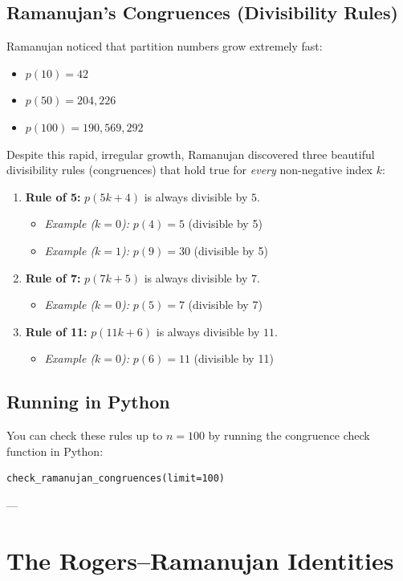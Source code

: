 \documentclass[11pt]{article}
\begin{document}
\subsection{Ramanujan's Congruences (Divisibility Rules)}
Ramanujan noticed that partition numbers grow extremely fast:
\begin{itemize}
    \item $p(10) = 42$
    \item $p(50) = 204,226$
    \item $p(100) = 190,569,292$
\end{itemize}
Despite this rapid, irregular growth, Ramanujan discovered three beautiful divisibility rules (congruences) that hold true for \emph{every} non-negative index $k$:
\begin{enumerate}
    \item \textbf{Rule of 5:} $p(5k + 4)$ is always divisible by $5$.
    \begin{itemize}
        \item \emph{Example ($k=0$):} $p(4) = 5$ (divisible by 5)
        \item \emph{Example ($k=1$):} $p(9) = 30$ (divisible by 5)
    \end{itemize}
    \item \textbf{Rule of 7:} $p(7k + 5)$ is always divisible by $7$.
    \begin{itemize}
        \item \emph{Example ($k=0$):} $p(5) = 7$ (divisible by 7)
    \end{itemize}
    \item \textbf{Rule of 11:} $p(11k + 6)$ is always divisible by $11$.
    \begin{itemize}
        \item \emph{Example ($k=0$):} $p(6) = 11$ (divisible by 11)
    \end{itemize}
\end{enumerate}

\subsection{Running in Python}
You can check these rules up to $n=100$ by running the congruence check function in Python:
\begin{lstlisting}
check_ramanujan_congruences(limit=100)
\end{lstlisting}

---

\section{The Rogers--Ramanujan Identities}
\end{document}
